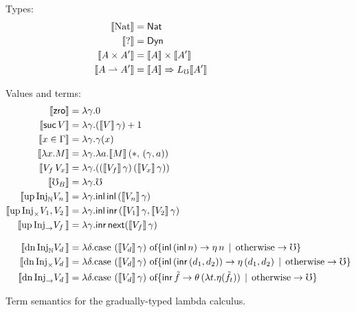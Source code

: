 \begin{figure*}
  \noindent Types:
  \begin{align*}
    \sem{\nat} &= \Nat \\
    \sem{\dyn} &= \Dyn \\
    \sem{A \times A'} &= \sem{A} \times \sem{A'} \\ 
    \sem{A \ra A'} &= \sem{A} \To \li \sem{A'} \\
  \end{align*}


  \noindent Values and terms:
  \begin{align*}
    \sem{\zro}         &= \lambda \gamma . 0 \\
    \sem{\suc\, V}     &= \lambda \gamma . (\sem{V}\, \gamma) + 1 \\
    \sem{x \in \Gamma} &= \lambda \gamma . \gamma(x) \\
    \sem{\lda{x}{M}}   &= \lambda \gamma . \lambda a . \sem{M}\, (*,\, (\gamma , a))  \\
    \sem{V_f\, V_x}    &= \lambda \gamma . {({(\sem{V_f}\, \gamma)} \, {(\sem{V_x}\, \gamma)})} \\
    \sem{\err_B}       &= \lambda \gamma . \mho \\
    \sem{\upc{\inat{V_n}}} &= \lambda \gamma . \inl\, \inl\, (\sem{V_n}\, \gamma) \\
    \sem{\upc{\itimes{V_1, V_2}}} &= \lambda \gamma . \inl\, \inr\, (\sem{V_1}\, \gamma, \sem{V_2}\, \gamma) \\
    \sem{\upc{\iarr{V_f}}} &= \lambda \gamma . \inr\, \nxt (\sem{V_f}\, \gamma) \\[2ex]
    \sem{\dnc{\inat V_d}} &=
      \lambda \delta . \text{case $(\sem{V_d}\, \gamma)$ of}
      \{ \inl\, (\inl\, n) \to \eta\, n
         \alt \text{otherwise} \to \mho \} \\
    \sem{\dnc{\itimes V_d}} &=
      \lambda \delta . \text{case $(\sem{V_d}\, \gamma)$ of}
      \{ \inl\, (\inr\, (d_1, d_2)) \to \eta\, (d_1, d_2)
         \alt \text{otherwise} \to \mho \} \\
    \sem{\dnc{\iarr V_d}} &=
      \lambda \delta . \text{case $(\sem{V_d}\, \gamma)$ of}
      \{ \inr\, \tilde{f} \to \theta\, (\lambda t. \eta (\tilde{f}_t))
         \alt \text{otherwise} \to \mho \} \\
  \end{align*}

  \caption{Term semantics for the gradually-typed lambda calculus.}
  \label{fig:term-semantics}
\end{figure*}
